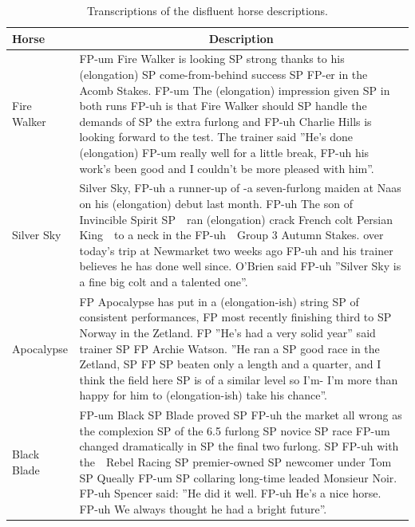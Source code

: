\documentclass[
  man,floatsintext]{apa7}
\begin{document}
\begin{table}[tbp]

\begin{center}
\begin{threeparttable}

\caption{\label{tab:tab-horse-description-disfluent}Transcriptions of the disfluent horse descriptions.}

\begin{tabular}{m{2cm}m{13cm}}
\toprule
Horse & \multicolumn{1}{c}{Description}\\
\midrule
Fire Walker & FP-um Fire Walker is looking SP strong thanks to his (elongation) SP come-from-behind success SP FP-er in the Acomb Stakes. FP-um The (elongation) impression given SP in both runs FP-uh is that Fire Walker should SP handle the demands of SP the extra furlong and FP-uh Charlie Hills is looking forward to the test. The trainer said ''He's done (elongation) FP-um really well for a little break, FP-uh his work's been good and I couldn't be more pleased with him''.\\
Silver Sky & Silver Sky, FP-uh a runner-up of -a seven-furlong maiden at Naas on his (elongation) debut last month. FP-uh The son of Invincible Spirit SP\ \ ran (elongation) crack French colt Persian King\ \  to a neck in the FP-uh\ \ Group 3 Autumn Stakes. over today's trip at Newmarket two weeks ago FP-uh and his trainer believes he has done well since. O'Brien said FP-uh ''Silver Sky is a fine big colt and a talented one''.\\
Apocalypse & FP Apocalypse has put in a (elongation-ish) string SP of consistent performances, FP most recently finishing third to SP Norway in the Zetland. FP ''He's had a very solid year'' said trainer SP FP Archie Watson. ''He ran a SP good race in the Zetland, SP FP SP beaten only a length and a quarter, and I think the field here SP is of a similar level so I'm- I'm more than happy for him to (elongation-ish) take his chance''.\\
Black Blade & FP-um Black SP Blade proved SP FP-uh the market all wrong as the complexion SP of the 6.5 furlong SP novice SP race FP-um changed dramatically in SP the final two furlong. SP FP-uh with the\ \ Rebel Racing SP premier-owned SP newcomer under Tom SP Queally FP-um SP collaring long-time leaded Monsieur Noir. FP-uh Spencer said: ''He did it well. FP-uh He's a nice horse. FP-uh We always thought he had a bright future''.\\
\bottomrule
\end{tabular}

\end{threeparttable}
\end{center}

\end{table}
\end{document}
